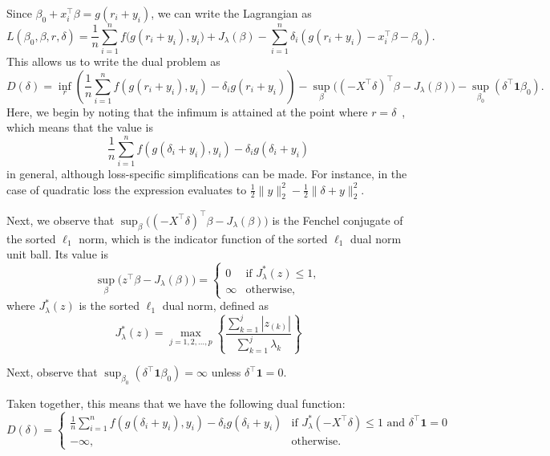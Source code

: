 \documentclass[article]{jss}
\begin{document}
\begin{appendix}
  Since \(\beta_0 + x_i^\intercal \beta = g(r_i + y_i)\), we can write the Lagrangian as
  \[
    L(\beta_0,\beta,r,\delta) = \frac{1}{n} \sum_{i=1}^n f\big(g(r_i + y_i), y_i\big) + J_{\lambda}(\beta) - \sum_{i=1}^n \delta_i \left(g(r_i + y_i) - x_i^\intercal \beta - \beta_0 \right).
  \]
  This allows us to write the dual problem as
  \[
    D(\delta)  = \inf_r\left( \frac{1}{n} \sum_{i=1}^n f\left(g(r_i+y_i), y_i\right) - \delta_i g(r_i+ y_i)\right)
    - \sup_\beta \big((-X^\intercal \delta)^\intercal \beta -  J_\lambda(\beta) \big)
    - \sup_{\beta_0} \left( \delta^\intercal \bm{1} \beta_0\right).
  \]
  Here, we begin by noting that the infimum is attained at the point where
  \(r = \delta\)~\citep{fercoq2015}, which means that the value is
  \[
    \frac{1}{n} \sum_{i=1}^n f\left(g(\delta_i+y_i), y_i\right) - \delta_i g(\delta_i + y_i)
  \]
  in general, although loss-specific simplifications can be made. For instance, in the case of
  quadratic loss the expression evaluates to \(\frac{1}{2} \lVert y \rVert_2^2 - \frac{1}{2} \lVert \delta + y \lVert^2_2 \).

  Next, we observe that \(\sup_\beta \big((-X^\intercal
  \delta)^\intercal \beta -  J_\lambda(\beta) \big)\) is the Fenchel conjugate of
  the sorted \(\ell_1\) norm, which is the indicator function of the sorted
  \(\ell_1\) dual norm unit ball. Its value is
  \[
    \sup_\beta \big(z^\intercal \beta -  J_\lambda(\beta) \big) =
    \begin{cases}
      0      & \text{if } J^*_\lambda(z) \leq 1, \\
      \infty & \text{otherwise},
    \end{cases}
  \]
  where \(J^*_\lambda(z)\) is the sorted \(\ell_1\) dual norm, defined as~\citep{negrinho2014}
  \begin{equation}
    J^*_\lambda(z) = \max_{j=1,2,\dots,p}\left\{ \frac{\sum_{k=1}^j|z_{(k)}|}{\sum_{k=1}^j\lambda_k}\right\}
  \end{equation}

  Next, observe that \(\sup_{\beta_0} (\delta^\intercal \bm{1} \beta_0) = \infty\) unless
  \(\delta^\intercal \bm{1} = 0\).

  Taken together, this means that we have the following dual function:
  \begin{equation}
    D(\delta) = \begin{cases}
      \frac{1}{n} \sum_{i=1}^n f\left(g(\delta_i+y_i), y_i\right) - \delta_i g(\delta_i+ y_i) & \text{if } J^*_\lambda(-X^\intercal \delta) \leq 1 \text{ and } \delta^\intercal \bm{1} = 0 \\
      -\infty,                                                                                & \text{otherwise}.
    \end{cases}
  \end{equation}


\end{appendix}
\end{document}
